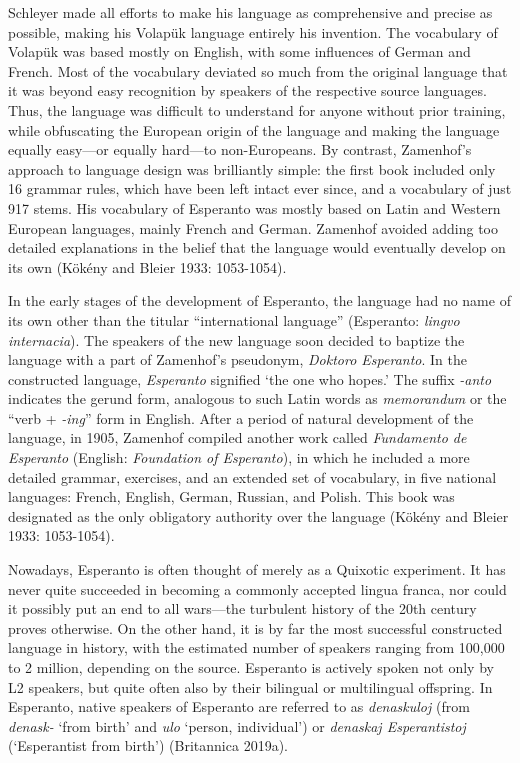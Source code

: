 Schleyer made all efforts to make his language as comprehensive and precise as possible, making his Volapük language entirely his invention.
The vocabulary of Volapük was based mostly on English, with some influences of German and French.
Most of the vocabulary deviated so much from the original language that it was beyond easy recognition by speakers of the respective source languages.
Thus, the language was difficult to understand for anyone without prior training, while obfuscating the European origin of the language and making the language equally easy---or equally hard---to non-Europeans.
By contrast, Zamenhof's approach to language design was brilliantly simple: the first book included only 16 grammar rules, which have been left intact ever since, and a vocabulary of just 917 stems.
His vocabulary of Esperanto was mostly based on Latin and Western European languages, mainly French and German.
Zamenhof avoided adding too detailed explanations in the belief that the language would eventually develop on its own
(Kökény and Bleier 1933: 1053-1054).

In the early stages of the development of Esperanto, the language had no name of its own other than the titular ``international language'' (Esperanto: \textit{lingvo internacia}).
The speakers of the new language soon decided to baptize the language with a part of Zamenhof's pseudonym, \textit{Doktoro Esperanto}.
In the constructed language, \textit{Esperanto} signified `the one who hopes.' The suffix \textit{-anto} indicates the gerund form, analogous to such Latin words as \textit{memorandum} or the ``verb + \textit{-ing}'' form in English.
After a period of natural development of the language, in 1905, Zamenhof compiled another work called \textit{Fundamento de Esperanto} (English: \textit{Foundation of Esperanto}), in which he included a more detailed grammar, exercises, and an extended set of vocabulary, in five national languages: French, English, German, Russian, and Polish.
This book was designated as the only obligatory authority over the language
(Kökény and Bleier 1933: 1053-1054).

Nowadays, Esperanto is often thought of merely as a Quixotic experiment.
It has never quite succeeded in becoming a commonly accepted lingua franca, nor could it possibly put an end to all wars---the turbulent history of the 20th century proves otherwise.
On the other hand, it is by far the most successful constructed language in history, with the estimated number of speakers ranging from 100,000 to 2 million, depending on the source.
Esperanto is actively spoken not only by L2 speakers, but quite often also by their bilingual or multilingual offspring.
In Esperanto, native speakers of Esperanto are referred to as \textit{denaskuloj} (from \textit{denask-} `from birth' and \textit{ulo} `person, individual') or \textit{denaskaj Esperantistoj} (`Esperantist from birth')
(Britannica 2019a).

